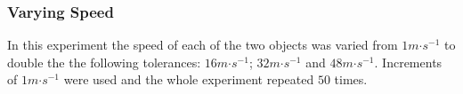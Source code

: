 

\subsubsection{Varying Speed}

In this experiment the speed of each of the two objects was varied from $1m\mathord{\cdot}s^{-1}$ to double the the following tolerances: $16m\mathord{\cdot}s^{-1}$; $32m\mathord{\cdot}s^{-1}$ and $48m\mathord{\cdot}s^{-1}$. Increments of $1m\mathord{\cdot}s^{-1}$ were used and the whole experiment repeated $50$ times.

